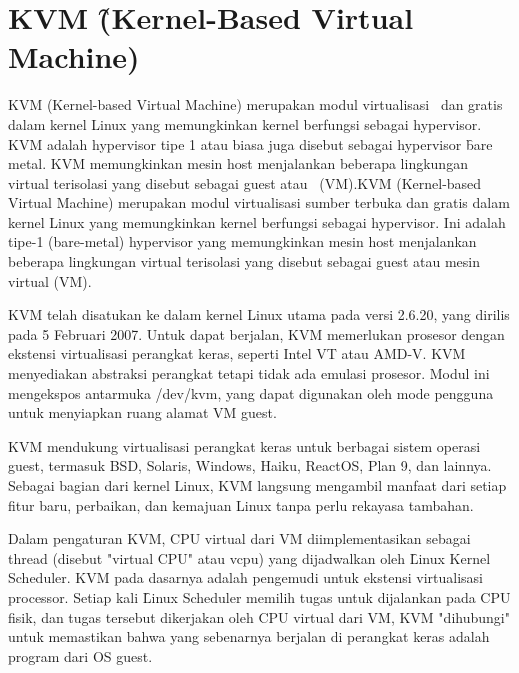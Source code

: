 \section{KVM \f{(Kernel-Based Virtual Machine)}}

KVM (Kernel-based Virtual Machine) merupakan modul virtualisasi \oss\ dan gratis dalam kernel Linux yang memungkinkan kernel berfungsi sebagai hypervisor. KVM adalah hypervisor tipe 1 atau biasa juga disebut sebagai hypervisor \f{bare metal}. KVM memungkinkan mesin host menjalankan beberapa lingkungan virtual terisolasi yang disebut sebagai guest atau \vm\ (VM).KVM (Kernel-based Virtual Machine) merupakan modul virtualisasi sumber terbuka dan gratis dalam kernel Linux yang memungkinkan kernel berfungsi sebagai hypervisor. Ini adalah tipe-1 (bare-metal) hypervisor yang memungkinkan mesin host menjalankan beberapa lingkungan virtual terisolasi yang disebut sebagai guest atau mesin virtual (VM).

KVM telah disatukan ke dalam kernel Linux utama pada versi 2.6.20, yang dirilis pada 5 Februari 2007. Untuk dapat berjalan, KVM memerlukan prosesor dengan ekstensi virtualisasi perangkat keras, seperti Intel VT atau AMD-V. KVM menyediakan abstraksi perangkat tetapi tidak ada emulasi prosesor. Modul ini mengekspos antarmuka /dev/kvm, yang dapat digunakan oleh mode pengguna untuk menyiapkan ruang alamat VM guest.

KVM mendukung virtualisasi perangkat keras untuk berbagai sistem operasi guest, termasuk BSD, Solaris, Windows, Haiku, ReactOS, Plan 9, dan lainnya. Sebagai bagian dari kernel Linux, KVM langsung mengambil manfaat dari setiap fitur baru, perbaikan, dan kemajuan Linux tanpa perlu rekayasa tambahan.

Dalam pengaturan KVM, CPU virtual dari VM diimplementasikan sebagai thread (disebut "virtual CPU" atau vcpu) yang dijadwalkan oleh \f{Linux Kernel Scheduler}. KVM pada dasarnya adalah pengemudi untuk ekstensi virtualisasi processor. Setiap kali \f{Linux Scheduler} memilih tugas untuk dijalankan pada CPU fisik, dan tugas tersebut dikerjakan oleh CPU virtual dari VM, KVM "dihubungi" untuk memastikan bahwa yang sebenarnya berjalan di perangkat keras adalah program dari OS guest\cite{Abeni2020}.

